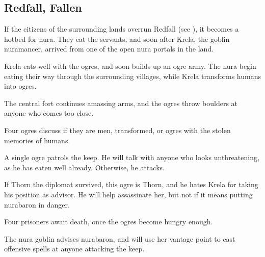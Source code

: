 \subsection{Redfall, Fallen}
\label{redfallFallen}


If the citizens of the surrounding lands overrun Redfall (see ), it becomes a hotbed for nura.
They eat the servants, and soon after Krela, the goblin nuramancer, arrived from one of the open nura portals in the land.

Krela eats well with the ogres, and soon builds up an ogre army.
The nura begin eating their way through the surrounding \glspl{village}, while Krela transforms humans into ogres.

The central fort continues amassing arms, and the ogres throw boulders at anyone who comes too close.


Four ogres discuss if they are men, transformed, or ogres with the stolen memories of humans.



A single ogre patrols the keep.
He will talk with anyone who looks unthreatening, as he has eaten well already.
Otherwise, he attacks.

If Thorn the diplomat survived, this ogre is Thorn, and he hates Krela for taking his position as advisor.
He will help assassinate her, but not if it means putting \gls{nurabaron} in danger.



Four prisoners await death, once the ogres become hungry enough.


The nura goblin advises \gls{nurabaron}, and will use her vantage point to cast offensive spells at anyone attacking the keep.




